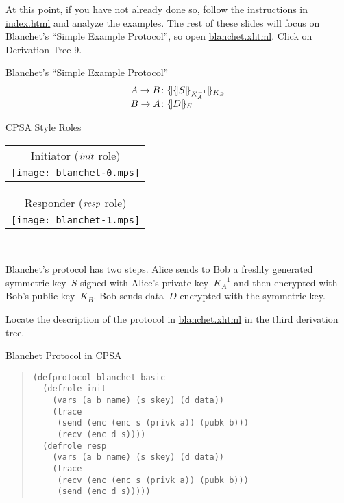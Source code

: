 \documentclass[landscape]{slides}
\newcommand{\fn}[1]{\ensuremath{\mathop{\relax
                    \smash{\it#1}}\!\mathop{\vphantom{#1}}\nolimits}}
\newcommand{\enc}[2]{\{\!|#1|\!\}_{#2}}
\newcommand{\pubk}[1]{K_{#1}}
\newcommand{\privk}[1]{K^{-1}_{#1}}
\begin{document}
\begin{note}
  At this point, if you have not already done so, follow the
  instructions in \url{index.html} and analyze the examples.  The rest
  of these slides will focus on Blanchet's ``Simple Example
  Protocol'', so open \url{blanchet.xhtml}.  Click on
  Derivation Tree 9.
\end{note}

\begin{mitreslide}{Blanchet's ``Simple Example Protocol''}
$$\begin{array}{r@{{}\colon{}}l}
A\to B&\enc{\enc{S}{\privk{A}}}{\pubk{B}}\\
B\to A&\enc{D}{S}
\end{array}$$
\begin{center}
CPSA Style Roles \\[2ex]
\begin{tabular}{c}
Initiator ($\fn{init}$ role)\\[3ex]
\texttt{[image: blanchet-0.mps]}
\end{tabular}\hfil
\begin{tabular}{c}
Responder ($\fn{resp}$ role)\\[3ex]
\texttt{[image: blanchet-1.mps]}
\end{tabular}\\[3ex]
\end{center}
\end{mitreslide}

\begin{note}
  Blanchet's protocol has two steps.
  Alice sends to Bob a freshly generated symmetric key~$S$ signed with Alice's
  private key~$\privk{A}$ and then encrypted with Bob's public
  key~$\pubk{B}$.  Bob sends data~$D$ encrypted with the symmetric key.

  Locate the description of the protocol in \url{blanchet.xhtml} in
  the third derivation tree.
\end{note}

\begin{mitreslide}{Blanchet Protocol in CPSA}
\begin{quote}
\begin{verbatim}
(defprotocol blanchet basic
  (defrole init
    (vars (a b name) (s skey) (d data))
    (trace
     (send (enc (enc s (privk a)) (pubk b)))
     (recv (enc d s))))
  (defrole resp
    (vars (a b name) (s skey) (d data))
    (trace
     (recv (enc (enc s (privk a)) (pubk b)))
     (send (enc d s)))))
\end{verbatim}
\end{quote}
\end{mitreslide}
\end{document}
